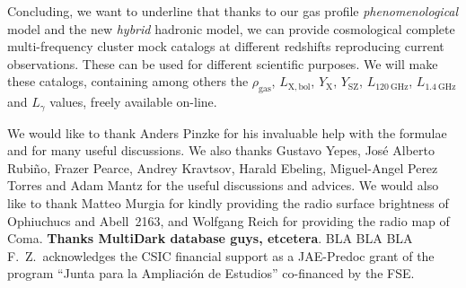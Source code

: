 \documentclass[traditabstract]{aa}
\newcommand{\rmn}{\mathrm}
\begin{document}
Concluding, we want to underline that thanks to our gas profile \emph{phenomenological} model and the new \emph{hybrid} hadronic model, we can provide cosmological complete multi-frequency cluster mock catalogs at different redshifts reproducing current observations. These can be used for different scientific purposes. We will make these catalogs, containing among others the $\rho_{\rmn{gas}}$, $L_{\rmn{X, bol}}$, $Y_{\rmn{X}}$, $Y_{\rmn{SZ}}$, $L_{120~\rmn{GHz}}$, $L_{1.4~\rmn{GHz}}$ and $L_{\gamma}$ values, freely available on-line.


\begin{acknowledgements}
We would like to thank Anders Pinzke for his invaluable help with the formulae and for many useful discussions. We also thanks Gustavo Yepes, Jos\'e Alberto Rubi\~no, Frazer Pearce, Andrey Kravtsov, Harald Ebeling, Miguel-Angel Perez Torres and Adam Mantz for the useful discussions and advices. We would also like to thank Matteo Murgia for kindly providing the radio surface brightness of Ophiuchucs and Abell~2163, and Wolfgang Reich for providing the radio map of Coma. {\bf Thanks MultiDark database guys, etcetera}.
BLA BLA BLA\\ 
F.~Z.~acknowledges the CSIC financial support as a JAE-Predoc grant of the program ``Junta para la Ampliaci\'on de Estudios'' co-financed by the FSE.
\end{acknowledgements}




\end{document}
